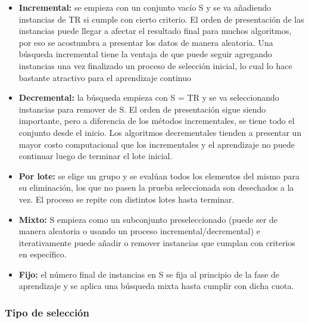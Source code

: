 \begin{itemize}
\item \textbf{Incremental:}
se empieza con un conjunto vacío S y se va añadiendo instancias de TR si cumple con cierto criterio. El orden de presentación de las instancias puede llegar a afectar el resultado final para muchos algoritmos, por eso se acostumbra a presentar los datos de manera aleatoria. Una búsqueda incremental tiene la ventaja de que puede seguir agregando instancias una vez finalizado un proceso de selección inicial, lo cual lo hace bastante atractivo para el aprendizaje continuo

\item \textbf{Decremental:}
la búsqueda empieza con S = TR y se va seleccionando instancias para remover de S. El orden de presentación sigue siendo importante, pero a diferencia de los métodos incrementales, se tiene todo el conjunto desde el inicio. Los algoritmos decrementales tienden a presentar un mayor costo computacional que los incrementales y el aprendizaje no puede continuar luego de terminar el lote inicial.

\item \textbf{Por lote:}
se elige un grupo y se evalúan todos los elementos del mismo para su eliminación, los que no pasen la prueba seleccionada son desechados a la vez. El proceso se repite con distintos lotes hasta terminar.

\item \textbf{Mixto:}
S empieza como un subconjunto preseleccionado (puede ser de manera aleatoria o usando un proceso incremental/decremental) e iterativamente puede añadir o remover instancias que cumplan con criterios en específico.

\item \textbf{Fijo:}
el número final de instancias en S se fija al principio de la fase de aprendizaje y se aplica una búsqueda mixta hasta cumplir con dicha cuota.
\end{itemize}

\subsubsection{Tipo de selección}

